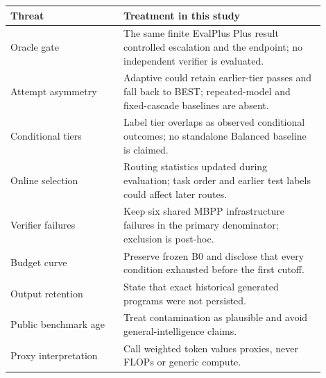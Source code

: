 \begin{tabular}{p{0.32\linewidth}p{0.58\linewidth}}
\toprule
Threat & Treatment in this study \\
\midrule
Oracle gate & The same finite EvalPlus Plus result controlled escalation and the endpoint; no independent verifier is evaluated. \\
Attempt asymmetry & Adaptive could retain earlier-tier passes and fall back to BEST; repeated-model and fixed-cascade baselines are absent. \\
Conditional tiers & Label tier overlaps as observed conditional outcomes; no standalone Balanced baseline is claimed. \\
Online selection & Routing statistics updated during evaluation; task order and earlier test labels could affect later routes. \\
Verifier failures & Keep six shared MBPP infrastructure failures in the primary denominator; exclusion is post-hoc. \\
Budget curve & Preserve frozen B0 and disclose that every condition exhausted before the first cutoff. \\
Output retention & State that exact historical generated programs were not persisted. \\
Public benchmark age & Treat contamination as plausible and avoid general-intelligence claims. \\
Proxy interpretation & Call weighted token values proxies, never FLOPs or generic compute. \\
\bottomrule
\end{tabular}
